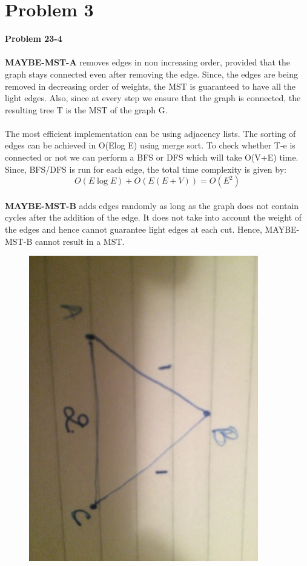 \documentclass[10pt]{article}
\begin{document}
\section{Problem 3}
\textbf{Problem 23-4}\\\\
\textbf{MAYBE-MST-A} removes edges in non increasing order, provided that the graph stays connected even after removing the edge. Since, the edges are being removed in decreasing order of weights, the MST is guaranteed to have all the light edges. Also, since at every step we ensure that the graph is connected, the resulting tree T is the MST of the graph G.\\\\
The most efficient implementation can be using adjacency lists. The sorting of edges can be achieved in O(Elog E) using merge sort. To check whether T-{e} is connected or not we can perform a BFS or DFS which will take O(V+E) time. Since, BFS/DFS is run for each edge, the total time complexity is given by: $$O(E\log E) + O(E(E+V)) = O(E^2)$$\\
\textbf{MAYBE-MST-B} adds edges randomly as long as the graph does not contain cycles after the addition of the edge. It does not take into account the weight of the edges and hence cannot guarantee light edges at each cut. Hence, MAYBE-MST-B cannot result in a MST.
\begin{figure}[ht!]
\includegraphics[width=100mm]{IMG_2510.JPG}
\end{figure}\\
\end{document}

